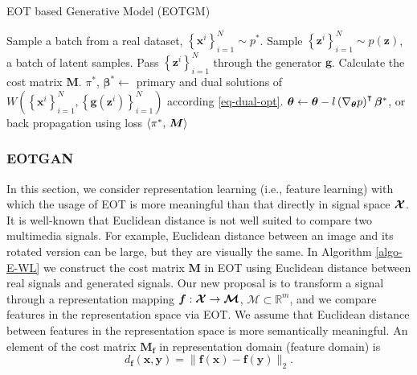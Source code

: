 \begin{algorithm}[!t]
  \caption{EOT based Generative Model (EOTGM)}\label{algo-E-WL}
  \begin{algorithmic}[1]
    \STATE Sample  a batch from a real dataset, $\left\{ \bm{x}^{i} \right\}_{i=1}^{N} \sim p^{\ast}$. 
    \STATE Sample $\left\{ \bm{z}^{i} \right\}_{i=1}^{N} \sim p(\bm{z})$, a batch of latent samples.
    \STATE Pass $\left\{ \bm{z}^{i} \right\}_{i=1}^{N}$ through the generator $\bm{g}$.
    \STATE Calculate the cost matrix $\bm{M}$.
    \STATE $\pi^{\ast}$, $\bm{\beta}^{\ast} \gets$ primary and dual
    solutions of $W(\left\{ \bm{x}^{i} \right\}_{i=1}^{N}, \left\{
      \bm{g}(\bm{z}^{i})\right\}_{i=1}^{N})$ according \eqref{eq-dual-opt}.
    \STATE $\bm{\theta} \gets \bm{\theta} - l \left(\nabla_{\bm{\theta}}{p}\right)^{\intercal}
    \bm{\beta}^{\ast}$, or back propagation using loss $\langle \pi^{\ast},\,\bm{M}\rangle$
    \ENDWHILE
  \end{algorithmic}
\end{algorithm}

\subsubsection{EOTGAN}

In this section, we consider representation learning (i.e., feature
learning) with which the usage of EOT is more meaningful than that
directly in signal space $\bm{\mathcal{X}}$.
It is well-known that Euclidean distance is not well suited to compare
two multimedia signals. For example, Euclidean distance between an
image and its rotated version can be large, but they are visually the same. In Algorithm \ref{algo-E-WL} we construct the cost matrix $\bm{M}$ in EOT using 
Euclidean distance between real signals and generated signals. Our new proposal is to transform a signal through a representation mapping 
$\bm{f}: \bm{\mathcal{X}} \rightarrow \bm{\mathcal{M}}$, $\bm{\mathcal{M}}\subset\mathbb{R}^{m}$, and we compare features in the representation space via EOT. We assume that Euclidean distance
between features in the representation space is more semantically
meaningful. An element of the cost matrix $\bm{M_f}$ in representation domain (feature domain) is
\begin{equation}\label{def-similarity}
  d_{\bm{f}}(\bm{x}, \bm{y}) = \|\bm{f}(\bm{x})-\bm{f}(\bm{y})\|_{2}.
\end{equation}

